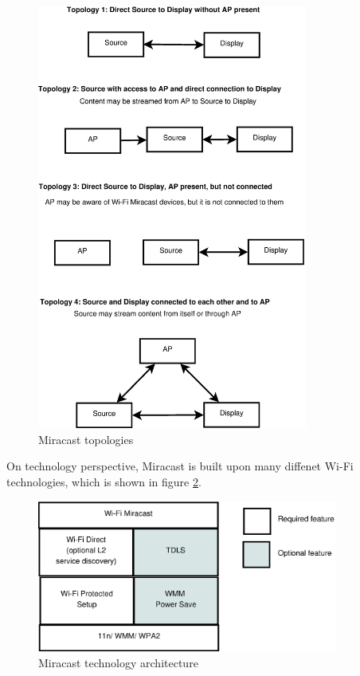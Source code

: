 \begin{figure}[htb] \centering
\includegraphics[height=14cm]{charts/miracast_model}
\caption{Miracast topologies \label{miracast_model}}
\end{figure}

On technology perspective, Miracast is built upon many diffenet Wi-Fi
technologies, which is shown in figure \ref{miracast_architect}.

\begin{figure}[htb] \centering
\includegraphics[height=5cm]{charts/miracast_technology_architecture}
\caption{Miracast technology architecture \label{miracast_architect}}
\end{figure}

